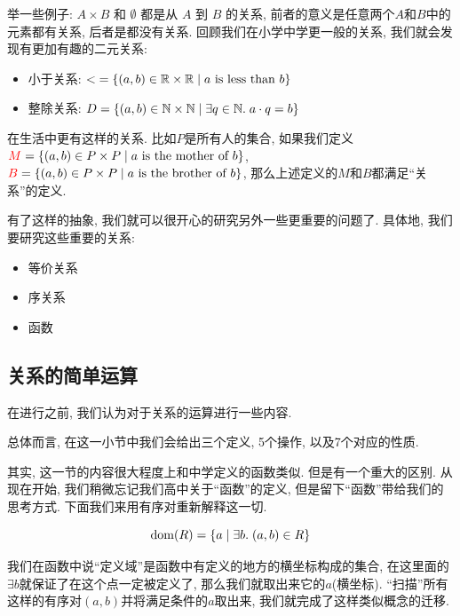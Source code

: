 举一些例子: $A\times B$ 和 $\emptyset$ 都是从 $A$ 到 $B$ 的关系, 前者的意义是任意两个$A$和$B$中的元素都有关系, 后者是都没有关系. 回顾我们在小学中学更一般的关系, 我们就会发现有更加有趣的二元关系: 
\begin{itemize}
  \item 小于关系: $<\; = \{(a, b) \in \mathbb{R} \times \mathbb{R} \mid a \text{ is less than } b\}$
  \item 整除关系: $D = \{(a, b) \in \mathbb{N} \times \mathbb{N} \mid \exists q \in \mathbb{N}.\; a \cdot q = b\}$
\end{itemize}

在生活中更有这样的关系. 比如$P$是所有人的集合, 如果我们定义$\textcolor{red}{M} = \{(a, b) \in P \times P \mid a \text{ is the mother of } b\}$, $\textcolor{red}{B} = \{(a, b) \in P \times P \mid a \text{ is the brother of } b\}$, 那么上述定义的$M$和$B$都满足``关系''的定义.

有了这样的抽象, 我们就可以很开心的研究另外一些更重要的问题了. 具体地, 我们要研究这些重要的关系: 
\begin{itemize}
  \item 等价关系
  \item 序关系
  \item 函数
\end{itemize}


\subsection{关系的简单运算}

在进行之前, 我们认为对于关系的运算进行一些内容. 

总体而言, 在这一小节中我们会给出三个定义, 5个操作, 以及7个对应的性质. 

其实, 这一节的内容很大程度上和中学定义的函数类似. 但是有一个重大的区别. 从现在开始, 我们稍微忘记我们高中关于``函数''的定义, 但是留下``函数''带给我们的思考方式. 下面我们来用有序对重新解释这一切. 


\begin{definition}
  \[
    \text{dom}(R) = \{a \mid \exists b.\; (a,b) \in R\}
  \]
\end{definition}

我们在函数中说``定义域''是函数中有定义的地方的横坐标构成的集合, 在这里面的$\exists b$就保证了在这个点一定被定义了, 那么我们就取出来它的$a$(横坐标). ``扫描''所有这样的有序对$(a,b)$并将满足条件的$a$取出来, 我们就完成了这样类似概念的迁移. 

